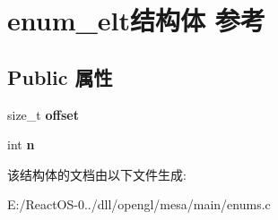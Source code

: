 \hypertarget{structenum__elt}{}\section{enum\+\_\+elt结构体 参考}
\label{structenum__elt}
\subsection*{Public 属性}
\begin{DoxyCompactItemize}
\item 
\mbox{\label{structenum__elt_aeda09baeb48efda92ff1bf3e08e2af3e}} 
size\+\_\+t {\bfseries offset}
\item 
\mbox{\label{structenum__elt_ab459be59292139c67dd2173fc126efa9}} 
int {\bfseries n}
\end{DoxyCompactItemize}


该结构体的文档由以下文件生成\+:\begin{DoxyCompactItemize}
\item 
E\+:/\+React\+O\+S-\/0../dll/opengl/mesa/main/enums.\+c\end{DoxyCompactItemize}
